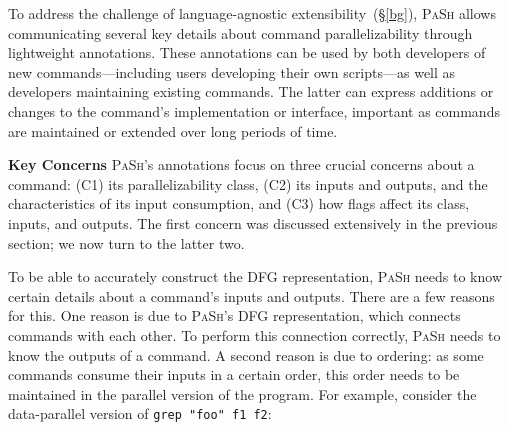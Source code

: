 \documentclass[sigplan, review, screen, anonymous]{acmart}
\newcommand{\heading}[1]{\vspace{4pt}\noindent\textbf{#1}\enspace}
\newcommand{\ttt}[1]{\texttt{#1}}
\newcommand{\nv}[1]{[{\color{cyan}nv: #1}]}
\newcommand{\kk}[1]{[{\color{magenta}kk: #1}]}
\newcommand{\sx}[1]{(\S\ref{#1})}
\newcommand{\sys}{{\scshape PaSh}\xspace}
\newcommand{\unix}{{\scshape Unix}\xspace}
\begin{document}

To address the challenge of language-agnostic extensibility~\sx{bg}, \sys allows communicating several key details about command parallelizability through lightweight annotations.
These annotations can be used by both developers of new commands---including users developing their own scripts---as well as developers maintaining existing commands.
The latter can express additions or changes to the command's implementation or interface, important as commands are maintained or extended over long periods of time.

\heading{Key Concerns}
\sys's annotations focus on three crucial concerns about a command:
  (C1) its parallelizability class,
  (C2) its inputs and outputs, and the characteristics of its input consumption, and
  (C3) how flags affect its class, inputs, and outputs.
The first concern was discussed extensively in the previous section; we now turn to the latter two.

To be able to accurately construct the DFG representation, \sys needs to know certain details about a command's inputs and outputs.
There are a few reasons for this.
One reason is due to \sys's DFG representation, which connects commands with each other.
  To perform this connection correctly, \sys needs to know the outputs of a command. %
A second reason is due to ordering:
  as some commands consume their inputs in a certain order, this order needs to be maintained in the parallel version of the program.
For example, consider the data-parallel version of \ttt{grep "foo" f1 f2}:
\end{document}

